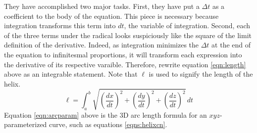 \documentclass{article}
\begin{document}
They have accomplished two major tasks. First, they have put a $\Delta t$ as a coefficient to the body of the equation. This piece is necessary because integration transforms this term into $dt$, the variable of integration. Second, each of the three terms under the radical looks suspiciously like the square of the limit definition of the derivative. Indeed, as integration minimizes the $\Delta t$ at the end of the equation to infinitesmal proportions, it will transform each expression into the derivative of its respective varaible. Therefore, rewrite equation \ref{eqn:length} above as an integrable statement. Note that $\ell$ is used to signify the length of the helix.
\begin{equation}\label{eqn:arcparam}
    \ell = \int_a^b\sqrt{\left(\frac{dx}{dt}\right)^2+\left(\frac{dy}{dt}\right)^2+\left(\frac{dz}{dt}\right)^2}\, dt
\end{equation}
Equation \ref{eqn:arcparam} above is the 3D arc length formula for an $xyz$-parameterized curve, such as equations \ref{eqns:helixcn}.
\end{document}
